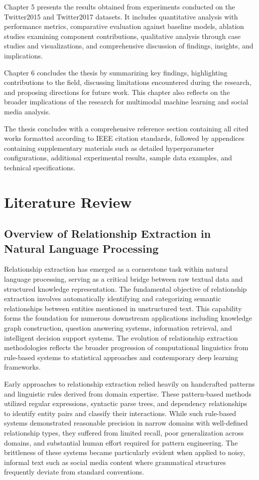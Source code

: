 \documentclass[12pt,a4paper]{report}
\begin{document}
Chapter 5 presents the results obtained from experiments conducted on the Twitter2015 and Twitter2017 datasets. It includes quantitative analysis with performance metrics, comparative evaluation against baseline models, ablation studies examining component contributions, qualitative analysis through case studies and visualizations, and comprehensive discussion of findings, insights, and implications.

Chapter 6 concludes the thesis by summarizing key findings, highlighting contributions to the field, discussing limitations encountered during the research, and proposing directions for future work. This chapter also reflects on the broader implications of the research for multimodal machine learning and social media analysis.

The thesis concludes with a comprehensive reference section containing all cited works formatted according to IEEE citation standards, followed by appendices containing supplementary materials such as detailed hyperparameter configurations, additional experimental results, sample data examples, and technical specifications.

\chapter{Literature Review}

\section{Overview of Relationship Extraction in Natural Language Processing}

Relationship extraction has emerged as a cornerstone task within natural language processing, serving as a critical bridge between raw textual data and structured knowledge representation. The fundamental objective of relationship extraction involves automatically identifying and categorizing semantic relationships between entities mentioned in unstructured text. This capability forms the foundation for numerous downstream applications including knowledge graph construction, question answering systems, information retrieval, and intelligent decision support systems. The evolution of relationship extraction methodologies reflects the broader progression of computational linguistics from rule-based systems to statistical approaches and contemporary deep learning frameworks.

Early approaches to relationship extraction relied heavily on handcrafted patterns and linguistic rules derived from domain expertise. These pattern-based methods utilized regular expressions, syntactic parse trees, and dependency relationships to identify entity pairs and classify their interactions. While such rule-based systems demonstrated reasonable precision in narrow domains with well-defined relationship types, they suffered from limited recall, poor generalization across domains, and substantial human effort required for pattern engineering. The brittleness of these systems became particularly evident when applied to noisy, informal text such as social media content where grammatical structures frequently deviate from standard conventions.
\end{document}

